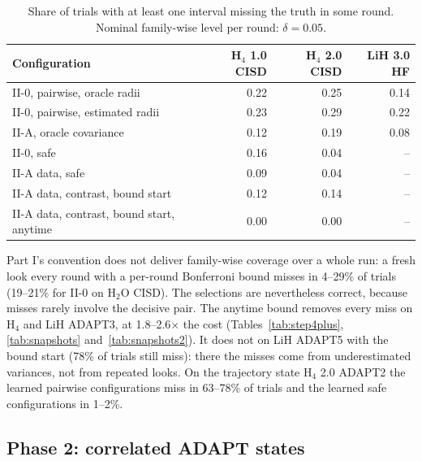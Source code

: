 \documentclass[10.5pt]{article}
\begin{document}
\begin{table}[!ht]
\centering\small
\caption{Share of trials with at least one interval missing the truth in some round. Nominal family-wise level per round: $\delta=0.05$.}
\label{tab:coverage}
\begin{tabular}{lrrr}
\toprule
Configuration & H$_4$ 1.0 CISD & H$_4$ 2.0 CISD & LiH 3.0 HF \\
\midrule
II-0, pairwise, oracle radii & 0.22 & 0.25 & 0.14 \\
II-0, pairwise, estimated radii & 0.23 & 0.29 & 0.22 \\
II-A, oracle covariance & 0.12 & 0.19 & 0.08 \\
II-0, safe & 0.16 & 0.04 & -- \\
II-A data, safe & 0.09 & 0.04 & -- \\
II-A data, contrast, bound start & 0.12 & 0.14 & -- \\
II-A data, contrast, bound start, anytime & 0.00 & 0.00 & -- \\
\bottomrule
\end{tabular}
\end{table}

Part I's convention does not deliver family-wise coverage over a whole run: a fresh look every round with a per-round Bonferroni bound misses in 4--29\% of trials (19--21\% for II-0 on H$_2$O CISD). The selections are nevertheless correct, because misses rarely involve the decisive pair. The anytime bound removes every miss on H$_4$ and LiH ADAPT3, at 1.8--2.6$\times$ the cost (Tables~\ref{tab:step4plus}, \ref{tab:snapshots} and~\ref{tab:snapshots2}). It does not on LiH ADAPT5 with the bound start (78\% of trials still miss): there the misses come from underestimated variances, not from repeated looks. On the trajectory state H$_4$ 2.0 ADAPT2 the learned pairwise configurations miss in 63--78\% of trials and the learned safe configurations in 1--2\%.

\subsection{Phase 2: correlated ADAPT states}
\end{document}

